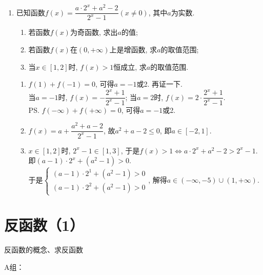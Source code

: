 \begin{enumerate}
\item 已知函数$f(x)=\dfrac{a\cdot2^x+a^2-2}{2^x-1}(x\neq0)$, 其中$a$为实数. 
\begin{enumerate}[(1)]
\item 若函数$f(x)$为奇函数, 求出$a$的值;
\item 若函数$f(x)$在$(0,+\infty )$上是增函数, 求$a$的取值范围;
\item 当$x\in\left[1,2\right]$时, $f(x)>1$恒成立, 求$a$的取值范围. 
\end{enumerate}
\begin{jieda}
\begin{enumerate}
\item $f(1)+f(-1)=0$, 可得$a=-1$或2. 再证一下. \\
当$a=-1$时, $f(x)=-\dfrac{2^x+1}{2^x-1}$; 当$a=2$时, $f(x)=2\cdot\dfrac{2^x+1}{2^x-1}$. \\
\ps $f(-\infty)+f(+\infty)=0$, 可得$a=-1$或2. 

\item $f(x)=a+\dfrac{a^2+a-2}{2^x-1}$, 故$a^2+a-2\leq 0$, 即$a\in[-2,1]$. 

\item $x\in\left[1,2\right]$时, $2^x-1\in[1,3]$, 于是$f(x)>1\iff a\cdot2^x+a^2-2>2^x-1$. \\
即$(a-1)\cdot 2^x+(a^2-1)>0$. \\
于是$\begin{cases}
(a-1)\cdot 2^1+(a^2-1)>0\\
(a-1)\cdot 2^2+(a^2-1)>0
\end{cases}$, 解得$a\in(-\infty,-5)\cup(1,+\infty)$. 
\end{enumerate}
\end{jieda}


\end{enumerate}


\section*{反函数（1）}
\zsd 反函数的概念、求反函数

A组：

